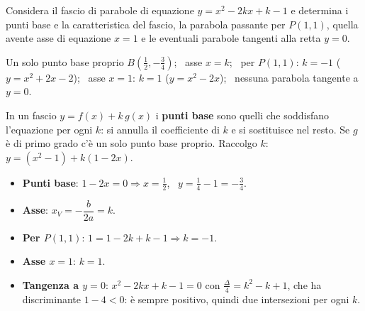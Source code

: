 \begin{question}[ID=5.1, subtitle={Fascio $y=x^2-2kx+k-1$: punti base e proprietà}, difficulty=media, tags={parabola, fasci}]
Considera il fascio di parabole di equazione $y=x^2-2kx+k-1$ e determina i punti base e la caratteristica del fascio, la parabola passante per $P(1,1)$, quella avente asse di equazione $x=1$ e le eventuali parabole tangenti alla retta $y=0$.
\begin{solution}
Un solo punto base proprio $B\left(\tfrac12,-\tfrac34\right)$; \ asse $x=k$; \ per $P(1,1)$: $k=-1$ ($y=x^2+2x-2$); \ asse $x=1$: $k=1$ ($y=x^2-2x$); \ nessuna parabola tangente a $y=0$.
\end{solution}
\begin{explanation}
In un fascio $y=f(x)+k\,g(x)$ i \textbf{punti base} sono quelli che soddisfano l'equazione per ogni $k$: si annulla il coefficiente di $k$ e si sostituisce nel resto. Se $g$ è di primo grado c'è un solo punto base proprio.
Raccolgo $k$: \ $y=(x^2-1)+k(1-2x)$.
\begin{itemize}
    \item \textbf{Punti base}: $1-2x=0 \Rightarrow x=\tfrac12$, \ $y=\tfrac14-1=-\tfrac34$.
    \item \textbf{Asse}: $x_V=-\dfrac{b}{2a}=k$.
    \item \textbf{Per $P(1,1)$}: $1=1-2k+k-1 \Rightarrow k=-1$.
    \item \textbf{Asse $x=1$}: $k=1$.
    \item \textbf{Tangenza a $y=0$}: $x^2-2kx+k-1=0$ con $\tfrac\Delta4=k^2-k+1$, che ha discriminante $1-4<0$: è sempre positivo, quindi due intersezioni per ogni $k$.
\end{itemize}
\end{explanation}
\end{question}


